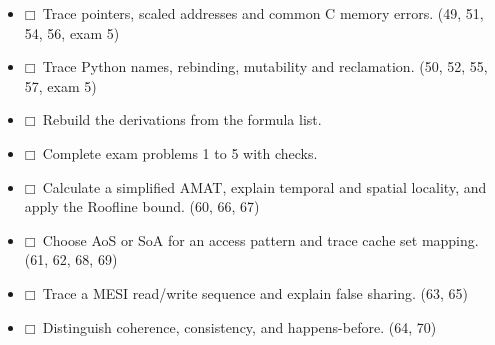 \documentclass[11pt]{article}
\begin{document}
\begin{keepsection}
\begin{itemize}
\item $\mdlgwhtsquare$\  Trace pointers, scaled addresses and common C memory errors. (49, 51, 54, 56, exam 5)
\item $\mdlgwhtsquare$\  Trace Python names, rebinding, mutability and reclamation. (50, 52, 55, 57, exam 5)
\item $\mdlgwhtsquare$\  Rebuild the derivations from the formula list.
\item $\mdlgwhtsquare$\  Complete exam problems 1 to 5 with checks.
\item $\mdlgwhtsquare$\  Calculate a simplified AMAT, explain temporal and spatial locality, and apply the Roofline bound. (60, 66, 67)
\item $\mdlgwhtsquare$\  Choose AoS or SoA for an access pattern and trace cache set mapping. (61, 62, 68, 69)
\item $\mdlgwhtsquare$\  Trace a MESI read/write sequence and explain false sharing. (63, 65)
\item $\mdlgwhtsquare$\  Distinguish coherence, consistency, and happens-before. (64, 70)
\end{itemize}
\end{keepsection}


\clearpage
\end{document}
